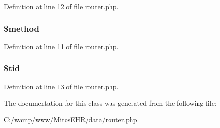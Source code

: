 \-Definition at line 12 of file router.\-php.

\hypertarget{class_action_a12661b2fc0f57f97e30a1620889ce9c6}{
\subsubsection[{\$method}]{\setlength{\rightskip}{0pt plus 5cm}\$method}}\label{class_action_a12661b2fc0f57f97e30a1620889ce9c6}


\-Definition at line 11 of file router.\-php.

\hypertarget{class_action_a4450bdc73ff7cfb495cb4ec69c98fce8}{
\subsubsection[{\$tid}]{\setlength{\rightskip}{0pt plus 5cm}\$tid}}\label{class_action_a4450bdc73ff7cfb495cb4ec69c98fce8}


\-Definition at line 13 of file router.\-php.



\-The documentation for this class was generated from the following file\-:\begin{DoxyCompactItemize}
\item 
\-C\-:/wamp/www/\-Mitos\-E\-H\-R/data/\hyperlink{router_8php}{router.\-php}\end{DoxyCompactItemize}
